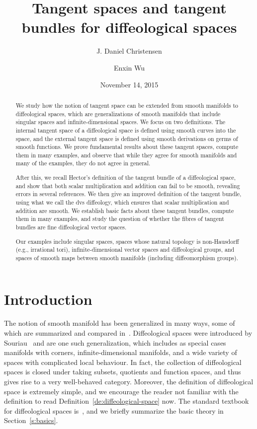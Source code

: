 \documentclass{amsart}
\title{Tangent spaces and tangent bundles \break for diffeological spaces}
\author{J. Daniel Christensen}
\author{Enxin Wu}
\date{November 14, 2015}
\theoremstyle{remark}
\begin{document}
%
%
%
%
%
%
%
%
%
%


\begin{abstract}
We study how the notion of tangent space can be extended from smooth
manifolds to diffeological spaces, which are generalizations of smooth
manifolds that include singular spaces and infinite-dimensional spaces.
We focus on two definitions.
The internal tangent space of a diffeological space is defined using
smooth curves into the space,
and the external tangent space is defined using smooth derivations on germs of smooth functions.
We prove fundamental results about these tangent spaces,
compute them in many examples, and observe
that while they agree for smooth manifolds and many of the examples, they
do not agree in general.

After this, we recall Hector's definition of the tangent bundle of a diffeological space,
and show that both scalar multiplication and addition can fail to be smooth,
revealing errors in several references.
We then give an improved definition of the tangent bundle, using what
we call the dvs diffeology, which ensures that scalar multiplication
and addition are smooth.
We establish basic facts about these tangent bundles, compute
them in many examples, and study the question of whether the fibres
of tangent bundles are fine diffeological vector spaces.

Our examples include singular spaces,
spaces whose natural topology is non-Hausdorff (e.g., irrational tori),
infinite-dimensional vector spaces and diffeological groups,
and spaces of smooth maps between smooth manifolds (including diffeomorphism groups).
\end{abstract}

\maketitle

\tableofcontents

\section{Introduction}

The notion of smooth manifold has been generalized in many ways, some
of which are summarized and compared in~\cite{St}.
Diffeological spaces were introduced by Souriau~\cite{So1,So2}
and are one such generalization, which includes as special cases
manifolds with corners, infinite-dimensional manifolds,
and a wide variety of spaces with complicated local behaviour.
In fact, the collection of diffeological spaces is closed under taking
subsets, quotients and function spaces, and thus gives rise to
a very well-behaved category.
Moreover, the definition of diffeological space is extremely simple,
and we encourage the reader not familiar with the definition to
read Definition~\ref{de:diffeological-space} now.
The standard textbook for diffeological spaces is~\cite{I3},
and we briefly summarize the basic theory in Section~\ref{s:basics}.
\end{document}
